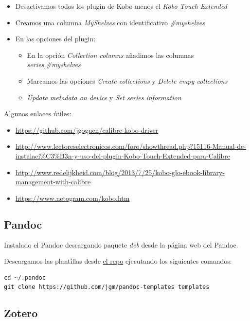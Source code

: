 \documentclass[12pt,spanish,]{article}
\providecommand{\tightlist}{%
  \setlength{\itemsep}{0pt}\setlength{\parskip}{0pt}}
\begin{document}
\begin{itemize}
\item
  Desactivamos todos los plugin de Kobo menos el \emph{Kobo Touch
  Extended}
\item
  Creamos una columna \emph{MyShelves} con identificativo
  \emph{\#myshelves}
\item
  En las opciones del plugin:

  \begin{itemize}
  \tightlist
  \item
    En la opción \emph{Collection columns} añadimos las columnas
    \emph{series,\#myshelves}
  \item
    Marcamos las opciones \emph{Create collections} y \emph{Delete empy
    collections}
  \item
    \emph{Update metadata on device} y \emph{Set series information}
  \end{itemize}
\end{itemize}

Algunos enlaces útiles:

\begin{itemize}
\tightlist
\item
  \url{https://github.com/jgoguen/calibre-kobo-driver}
\item
  \url{http://www.lectoreselectronicos.com/foro/showthread.php?15116-Manual-de-instalaci\%C3\%B3n-y-uso-del-plugin-Kobo-Touch-Extended-para-Calibre}
\item
  \url{http://www.redelijkheid.com/blog/2013/7/25/kobo-glo-ebook-library-management-with-calibre}
\item
  \url{https://www.netogram.com/kobo.htm}
\end{itemize}

\subsection{Pandoc}\label{pandoc}

Instalado el Pandoc descargando paquete \emph{deb} desde la página web
del Pandoc.

Descargamos las plantillas desde
\href{https://github.com/jgm/pandoc-templates}{el repo} ejecutando los
siguientes comandos:

\begin{verbatim}
cd ~/.pandoc
git clone https://github.com/jgm/pandoc-templates templates
\end{verbatim}

\subsection{Zotero}\label{zotero}
\end{document}
